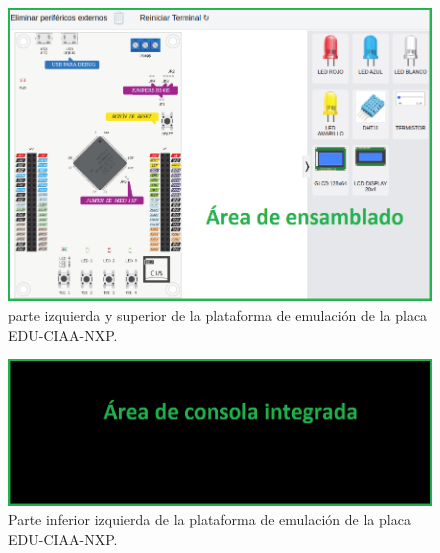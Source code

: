 \begin{figure}[ht]
	\centering
	\includegraphics[scale=.57]{./Figures/PlataformaEmulador1.png}
	\caption{parte izquierda y superior de la plataforma de emulación de la placa EDU-CIAA-NXP.}
	\label{fig:PlataformaEmulador2}
\end{figure}


\begin{figure}[ht]
	\centering
	\includegraphics[scale=.58]{./Figures/PlataformaEmulador2.png}
	\caption{Parte inferior izquierda de la plataforma de emulación de la placa EDU-CIAA-NXP.}
	\label{fig:PlataformaEmulador3}
\end{figure}


\hfill \break
\hfill \break
\hfill \break
\hfill \break
\hfill \break
\hfill \break
\hfill \break

